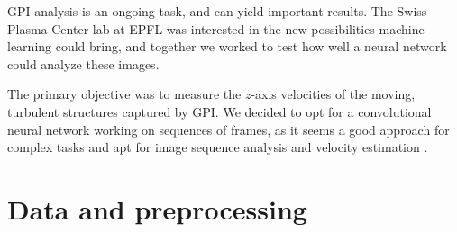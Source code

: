 \documentclass[10pt,conference]{IEEEtran}
\begin{document}
GPI analysis is an ongoing task, and can yield important results. The Swiss Plasma Center lab at EPFL was interested in the new possibilities machine learning could bring, and together we worked to test how well a neural network could analyze these images.\par
 

 
The primary objective was to measure the $z$-axis velocities of the moving, turbulent structures captured by GPI. We decided to opt for a convolutional neural network working on sequences of frames, as it seems a good approach for complex tasks and apt for image sequence analysis and velocity estimation \cite{velocitycnn}.



\section{Data and preprocessing}
\end{document}
